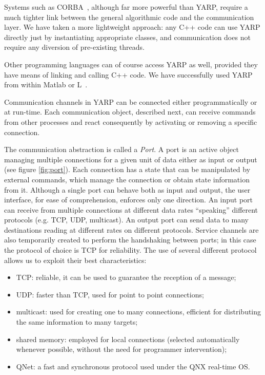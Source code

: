 Systems such as CORBA~\cite{vinoski97corba}, although far more powerful than YARP, require 
%
%
a much tighter link between the general algorithmic code and the communication layer.
%
%
We have taken a more lightweight approach: any C++ code can use YARP directly just by 
instantiating appropriate classes, and communication does not require any diversion
of pre-existing threads.
%

Other programming languages can of course access YARP as well, provided they
have means of linking and calling C++ code. We have successfully used
YARP from within Matlab or L~\cite{brooks90behavior}.

Communication channels in YARP can be connected either programmatically or at run-time.
Each communication object, described next, can receive commands from other processes and 
react consequently by activating or removing a specific connection.

The communication abstraction is called a {\em Port}. A port is an active object managing
multiple connections for a given unit of data either as input or output (see figure \ref{fig:port}). Each connection has
a state that can be manipulated by external commands, which manage the connection or obtain
state information from it. Although a single port can behave both as input and output, the 
user interface, for ease of comprehension, enforces only one direction. An input port can receive 
from multiple connections at different data rates ``speaking'' different protocols
(e.g. TCP, UDP, multicast). An output port can send data to many destinations reading at
different rates on different protocols. Service channels are also temporarily created to
perform the handshaking between ports; in this case the protocol of choice is TCP for
reliability. The use of several different protocol allows us to exploit their best
characteristics:
\begin{itemize} \pflist
	\item TCP: reliable, it can be used to guarantee the reception of a message;
	\item UDP: faster than TCP, used for point to point connections;
	\item multicast: used for creating one to many connections, efficient for distributing
	the same information to many targets;
	\item shared memory: employed for local connections (selected automatically whenever possible, without the need for programmer intervention);
	\item QNet: a fast and synchronous protocol used under the QNX real-time OS.
\end{itemize}

